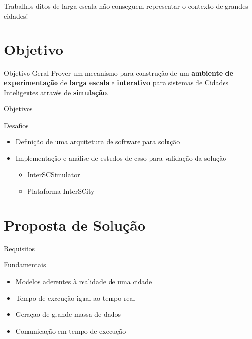 \documentclass[xcolor={usenames,svgnames,dvipsnames},brazil,english,12pt,aspectratio=149]{beamer}
\begin{document}
\begin{frame}[standout]
	Trabalhos ditos de larga escala não conseguem representar o contexto de grandes cidades!
\end{frame}

\section{Objetivo}

\begin{frame}
    \begin{block}{Objetivo Geral}
        Prover um mecanismo para construção de um \textbf{ambiente de experimentação} de \textbf{larga escala} e \textbf{interativo} para sistemas de Cidades Inteligentes através de \textbf{simulação}.
    \end{block}
\end{frame}

\begin{frame}{Objetivos}
    \begin{block}{Desafios}
        \begin{itemize}
            \item Definição de uma arquitetura de software para solução
            \item Implementação e análise de estudos de caso para validação da solução
                \begin{itemize}
                    \item InterSCSimulator
                    \item Plataforma InterSCity
                \end{itemize}
        \end{itemize}
    \end{block}
\end{frame}


\section{Proposta de Solução}

\begin{frame}{Requisitos}
    \begin{block}{Fundamentais}
        \begin{itemize}
            \item Modelos aderentes à realidade de uma cidade
            \item Tempo de execução igual ao tempo real
            \item Geração de grande massa de dados
            \item Comunicação em tempo de execução
        \end{itemize}
    \end{block}
\end{frame}
\end{document}
